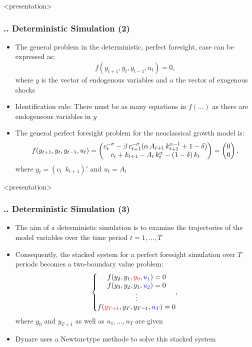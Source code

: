 \documentclass[11pt,aspectratio=169]{beamer}
\begin{document}
\begin{frame}<presentation>
	\frametitle{{\thesection.\thesubsection.\thesubsubsection} Deterministic Simulation (2)}
	\begin{itemize}
		\item The general problem in the deterministic, perfect foresight, case can be expressed as: $$f(y_{t+1},y_t,y_{t-1},u_t)=0,$$ where $y$ is the vector of endogenous variables and $u$ the vector of exogenous shocks
		\item Identification rule: There must be as many equations in $f(...)$ as there are endogeneous variables in $y$
		\item The general perfect foresight problem for the neoclassical growth model is:
		\begin{gather*}
		f(y_{t+1},y_t,y_{t-1},u_t) = \begin{pmatrix} 	c_t^{-\sigma} - \beta  \thinspace c_{t+1}^{-\sigma} (\alpha \thinspace A_{t+1}  \thinspace k_{t+1}^{\alpha -1} + 1 - \delta)\\ c_t + k_{t+1} - A_t  \thinspace k_t^\alpha - (1-\delta)  \thinspace k_t \end{pmatrix} = \begin{pmatrix}
		0 \\0
		\end{pmatrix},
		\end{gather*}
		where $y_t = (c_t \enspace k_{t+1})'$ and $u_t = A_t$
	\end{itemize}
\end{frame}
\begin{frame}<presentation>
	\frametitle{{\thesection.\thesubsection.\thesubsubsection} Deterministic Simulation (3)}
	\begin{itemize}
		\item The aim of a deterministic simulation is to examine the trajectories of the model variables over the time period $t = 1,...,T$
		\item Consequently, the stacked system for a perfect foresight simulation over $T$ periods becomes a two-boundary value problem: 
		$$\left\{ \begin{matrix} f(y_2,y_1,\mathbin{\textcolor{red}{y_0}},\mathbin{\textcolor{blue}{u_1}})=0 \\ 
		f(y_3,y_2,y_1,\mathbin{\textcolor{blue}{u_2}})=0 \\ 
		\vdots \\ 
		f(\mathbin{\textcolor{red}{y_{T+1}}},y_T,y_{T-1},\mathbin{\textcolor{blue}{u_T}})=0 
		\end{matrix},  \right.$$ 
		where $y_0$ and $y_{T+1}$ as well as $u_1,...,u_T$ are given
		\item Dynare uses a Newton-type methode to solve this stacked system
	\end{itemize}
\end{frame}
\end{document}
